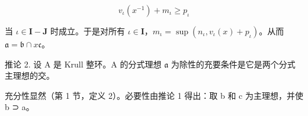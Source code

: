 \[
v _ {\iota} (x ^ {- 1}) + m _ {\iota} \geqslant p _ {\iota}
\]

当 \(\iota \in \mathbf{I} - \mathbf{J}\) 时成立。于是对所有 \(\iota \in \mathbf{I}\)，\(m_{\iota} = \sup (n_{\iota}, v_{\iota}(x) + p_{\iota})\)。从而 \(\mathfrak{a} = \mathfrak{b} \cap x\mathfrak{c}\)。

推论 2. 设 A 是 Krull 整环。A 的分式理想 \(\mathfrak{a}\) 为除性的充要条件是它是两个分式主理想的交。

充分性显然（第 1 节，定义 2）。必要性由推论 1 得出：取 b 和 c 为主理想，并使 b ⊃ a。

